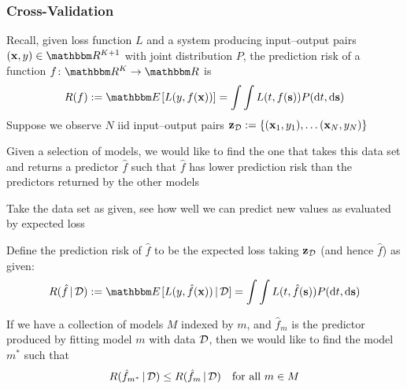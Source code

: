 \begin{frame}\frametitle{Cross-Validation}

    \vspace{2em}
    Recall, given loss function $L$ and a
    system producing input--output pairs $(\boldx, y) \in \RR^{K+1}$ with joint
    distribution $P$, the prediction risk of a function $f \colon \RR^K \to \RR$ is 
    \begin{equation*}
        R(f) := \EE [ L(y, f(\boldx)) ] = \int \int L(t, f(\bolds)) 
            P(\diff t, \diff \bolds)  
    \end{equation*}
    Suppose  we
    observe $N$ {\sc iid} input--output pairs
        $\mathbf{z}_{\mathcal D} := \{({\mathbf x}_1, y_1), \ldots ({\mathbf x}_N, y_N) \}$

     \vspace{.7em}
    Given a selection of models, we would like to find the one that takes this
    data set and returns a predictor $\hat f$ such that $\hat f$ has lower
    prediction risk than the predictors returned by the other models
    
\end{frame}

\begin{frame}
    
    \vspace{2em}
    Take the data set as given, see how well we can  predict
    new values as evaluated by expected loss
    
    Define the prediction risk of $\hat
    f$ to be the expected loss taking $\mathbf{z}_{\mathcal D}$ (and hence $\hat f$) as given:
    \begin{equation*}
        R(\hat f \given \dD) := \EE [ L(y, \hat f(\boldx)) \given \dD] 
        = \int \int L(t, \hat f(\bolds)) P(\diff t, \diff \bolds)  
    \end{equation*}
    
    \vspace{.7em}
    If we have a collection of models $M$ indexed by $m$, and $\hat f_m$ is the
    predictor produced by fitting model $m$ with data $\mathcal D$, then
    we would like to find the model $m^*$ such that
    \begin{equation*}
        R(\hat f_{m^*} \, | \, \mathcal D) \leq R(\hat f_m \, | \, \mathcal D)
        \quad \text{for all } 
        m \in M
    \end{equation*}
    
\end{frame}

